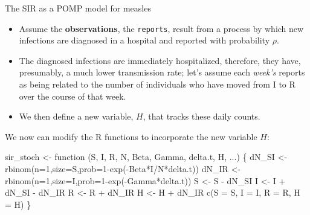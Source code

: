 \documentclass[
  ignorenonframetext,
  aspectratio=169,
  t]{beamer}
\newenvironment{Shaded}{\begin{snugshade}}{\end{snugshade}}
\newcommand{\AttributeTok}[1]{\textcolor[rgb]{0.40,0.45,0.13}{#1}}
\newcommand{\ControlFlowTok}[1]{\textcolor[rgb]{0.00,0.23,0.31}{#1}}
\newcommand{\DecValTok}[1]{\textcolor[rgb]{0.68,0.00,0.00}{#1}}
\newcommand{\FunctionTok}[1]{\textcolor[rgb]{0.28,0.35,0.67}{#1}}
\newcommand{\NormalTok}[1]{\textcolor[rgb]{0.00,0.23,0.31}{#1}}
\newcommand{\OtherTok}[1]{\textcolor[rgb]{0.00,0.23,0.31}{#1}}
\newcommand{\SpecialCharTok}[1]{\textcolor[rgb]{0.37,0.37,0.37}{#1}}
\theoremstyle{definition}
\begin{document}
\begin{frame}{The SIR as a POMP model for
measles}
\framebreak

\begin{itemize}
\item
  Assume the \textbf{observations}, the \texttt{reports}, result from a
  process by which new infections are diagnosed in a hospital and
  reported with probability \(\rho\).
\item
  The diagnosed infections are immediately hospitalized, therefore, they
  have, presumably, a much lower transmission rate; let's assume each
  \emph{week's} reports as being related to the number of individuals
  who have moved from I to R over the course of that week.
\item
  We then define a new variable, \(H\), that tracks these daily counts.
\end{itemize}

\framebreak

We now can modify the R functions to incorporate the new variable \(H\):

\begin{Shaded}
\begin{Highlighting}[]
\NormalTok{sir\_stoch }\OtherTok{\textless{}{-}} \ControlFlowTok{function}\NormalTok{ (S, I, R, N, Beta, Gamma, delta.t, H, ...) \{}
\NormalTok{  dN\_SI }\OtherTok{\textless{}{-}} \FunctionTok{rbinom}\NormalTok{(}\AttributeTok{n=}\DecValTok{1}\NormalTok{,}\AttributeTok{size=}\NormalTok{S,}\AttributeTok{prob=}\DecValTok{1}\SpecialCharTok{{-}}\FunctionTok{exp}\NormalTok{(}\SpecialCharTok{{-}}\NormalTok{Beta}\SpecialCharTok{*}\NormalTok{I}\SpecialCharTok{/}\NormalTok{N}\SpecialCharTok{*}\NormalTok{delta.t))}
\NormalTok{  dN\_IR }\OtherTok{\textless{}{-}} \FunctionTok{rbinom}\NormalTok{(}\AttributeTok{n=}\DecValTok{1}\NormalTok{,}\AttributeTok{size=}\NormalTok{I,}\AttributeTok{prob=}\DecValTok{1}\SpecialCharTok{{-}}\FunctionTok{exp}\NormalTok{(}\SpecialCharTok{{-}}\NormalTok{Gamma}\SpecialCharTok{*}\NormalTok{delta.t))}
\NormalTok{  S }\OtherTok{\textless{}{-}}\NormalTok{ S }\SpecialCharTok{{-}}\NormalTok{ dN\_SI}
\NormalTok{  I }\OtherTok{\textless{}{-}}\NormalTok{ I }\SpecialCharTok{+}\NormalTok{ dN\_SI }\SpecialCharTok{{-}}\NormalTok{ dN\_IR}
\NormalTok{  R }\OtherTok{\textless{}{-}}\NormalTok{ R }\SpecialCharTok{+}\NormalTok{ dN\_IR}
\NormalTok{  H }\OtherTok{\textless{}{-}}\NormalTok{ H }\SpecialCharTok{+}\NormalTok{ dN\_IR}
  \FunctionTok{c}\NormalTok{(}\AttributeTok{S =}\NormalTok{ S, }\AttributeTok{I =}\NormalTok{ I, }\AttributeTok{R =}\NormalTok{ R, }\AttributeTok{H =}\NormalTok{ H)}
\NormalTok{\}}


\end{Highlighting}
\end{Shaded}
\end{frame}
\end{document}

